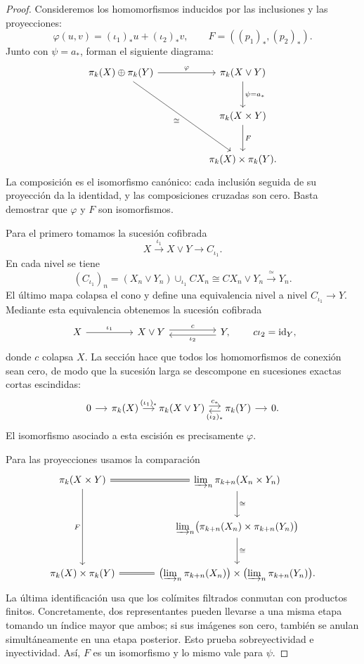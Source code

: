 \begin{proof}
Consideremos los homomorfismos inducidos por las inclusiones y las proyecciones:
\[
\varphi(u,v)=(\iota_1)_*u+(\iota_2)_*v,
\qquad F=((p_1)_*,(p_2)_*).
\]
Junto con $\psi=a_*$, forman el siguiente diagrama:
\[
\begin{tikzcd}[column sep=huge,row sep=large]
\pi_k(X)\oplus\pi_k(Y)\arrow[r,"\varphi"]\arrow[rdd,"\cong"']
&\pi_k(X\vee Y)\arrow[d,"\psi=a_*"]\\
&\pi_k(X\times Y)\arrow[d,"F"]\\
&\pi_k(X)\times\pi_k(Y).
\end{tikzcd}
\]
La composición es el isomorfismo canónico: cada inclusión seguida de su proyección da la identidad, y las composiciones cruzadas son cero. Basta demostrar que $\varphi$ y $F$ son isomorfismos.

Para el primero tomamos la sucesión cofibrada
\[
X\xrightarrow{\iota_1}X\vee Y\longrightarrow C_{\iota_1}.
\]
En cada nivel se tiene
\[
(C_{\iota_1})_n=(X_n\vee Y_n)\cup_{\iota_1}CX_n
\cong CX_n\vee Y_n\xrightarrow{\ \simeq\ }Y_n.
\]
El último mapa colapsa el cono y define una equivalencia nivel a nivel $C_{\iota_1}\to Y$. Mediante esta equivalencia obtenemos la sucesión cofibrada
\[
\begin{tikzcd}[column sep=huge]
X\arrow[r,"\iota_1"]&X\vee Y\arrow[r,"c",shift left=.6ex]
&Y\arrow[l,"\iota_2",shift left=.6ex],
\end{tikzcd}
\qquad c\iota_2=\id_Y,
\]
donde $c$ colapsa $X$. La sección hace que todos los homomorfismos de conexión sean cero, de modo que la sucesión larga se descompone en sucesiones exactas cortas escindidas:
\[
\begin{tikzcd}[column sep=small]
0\arrow[r]&\pi_k(X)\arrow[r,"(\iota_1)_*"]&\pi_k(X\vee Y)
\arrow[r,"c_*",shift left=.6ex]&\pi_k(Y)\arrow[l,"(\iota_2)_*",shift left=.6ex]\arrow[r]&0.
\end{tikzcd}
\]
El isomorfismo asociado a esta escisión es precisamente $\varphi$.

Para las proyecciones usamos la comparación
\[
\begin{tikzcd}[column sep=large,row sep=large]
\pi_k(X\times Y)\arrow[r,equal]\arrow[dd,"F"']
&\varinjlim\nolimits_n\pi_{k+n}(X_n\times Y_n)\arrow[d,"\cong"]\\
&\varinjlim\nolimits_n\bigl(\pi_{k+n}(X_n)\times\pi_{k+n}(Y_n)\bigr)\arrow[d,"\cong"]\\
\pi_k(X)\times\pi_k(Y)\arrow[r,equal]
&\bigl(\varinjlim\nolimits_n\pi_{k+n}(X_n)\bigr)\times
\bigl(\varinjlim\nolimits_n\pi_{k+n}(Y_n)\bigr).
\end{tikzcd}
\]
La última identificación usa que los colímites filtrados conmutan con productos finitos. Concretamente, dos representantes pueden llevarse a una misma etapa tomando un índice mayor que ambos; si sus imágenes son cero, también se anulan simultáneamente en una etapa posterior. Esto prueba sobreyectividad e inyectividad. Así, $F$ es un isomorfismo y lo mismo vale para $\psi$.
\end{proof}

